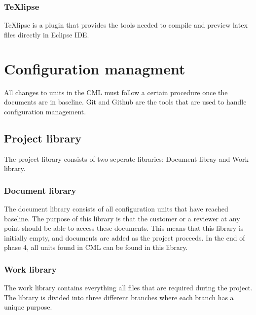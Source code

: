 \documentclass{article}
\begin{document}
        \subsubsection{TeXlipse}
            TeXlipse is a plugin that provides the tools needed to compile and preview
            latex files directly in Eclipse IDE.
    

\section{Configuration managment}   %
    All changes to units in the CML must follow a certain procedure once the documents
    are in baseline. Git and Github are the tools that are used to handle configuration management.

    \subsection{Project library \label{project_library}}
        The project library consists of two seperate libraries: Document libray and Work library.
    
        \subsubsection{Document library}
            The document library consists of all configuration units that have reached baseline.
            The purpose of this library is that the customer or a reviewer at any point should
            be able to access these documents.
            This means that this library is initially empty, and documents are added as the project proceeds. In the end of phase 4, all units found in CML can be found in this library.

            
        \subsubsection{Work library}
            The work library contains everything all files that are required during the project.
            The library is divided into three different branches where each branch has a unique purpose.
            
\end{document}
